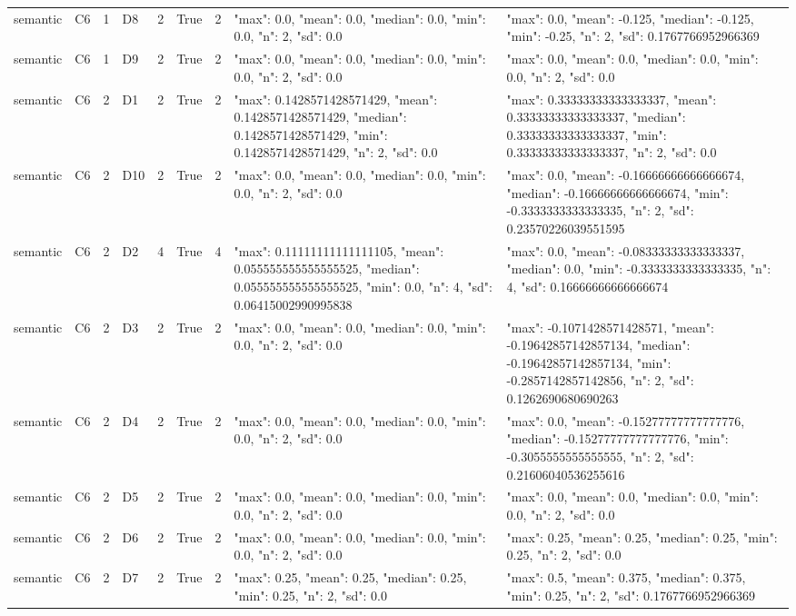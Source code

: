 \begin{tabular}{lllllllll}
semantic & C6 & 1 & D8 & 2 & True & 2 & {"max": 0.0, "mean": 0.0, "median": 0.0, "min": 0.0, "n": 2, "sd": 0.0} & {"max": 0.0, "mean": -0.125, "median": -0.125, "min": -0.25, "n": 2, "sd": 0.1767766952966369} \\
semantic & C6 & 1 & D9 & 2 & True & 2 & {"max": 0.0, "mean": 0.0, "median": 0.0, "min": 0.0, "n": 2, "sd": 0.0} & {"max": 0.0, "mean": 0.0, "median": 0.0, "min": 0.0, "n": 2, "sd": 0.0} \\
semantic & C6 & 2 & D1 & 2 & True & 2 & {"max": 0.1428571428571429, "mean": 0.1428571428571429, "median": 0.1428571428571429, "min": 0.1428571428571429, "n": 2, "sd": 0.0} & {"max": 0.33333333333333337, "mean": 0.33333333333333337, "median": 0.33333333333333337, "min": 0.33333333333333337, "n": 2, "sd": 0.0} \\
semantic & C6 & 2 & D10 & 2 & True & 2 & {"max": 0.0, "mean": 0.0, "median": 0.0, "min": 0.0, "n": 2, "sd": 0.0} & {"max": 0.0, "mean": -0.16666666666666674, "median": -0.16666666666666674, "min": -0.3333333333333335, "n": 2, "sd": 0.23570226039551595} \\
semantic & C6 & 2 & D2 & 4 & True & 4 & {"max": 0.11111111111111105, "mean": 0.055555555555555525, "median": 0.055555555555555525, "min": 0.0, "n": 4, "sd": 0.06415002990995838} & {"max": 0.0, "mean": -0.08333333333333337, "median": 0.0, "min": -0.3333333333333335, "n": 4, "sd": 0.16666666666666674} \\
semantic & C6 & 2 & D3 & 2 & True & 2 & {"max": 0.0, "mean": 0.0, "median": 0.0, "min": 0.0, "n": 2, "sd": 0.0} & {"max": -0.1071428571428571, "mean": -0.19642857142857134, "median": -0.19642857142857134, "min": -0.2857142857142856, "n": 2, "sd": 0.1262690680690263} \\
semantic & C6 & 2 & D4 & 2 & True & 2 & {"max": 0.0, "mean": 0.0, "median": 0.0, "min": 0.0, "n": 2, "sd": 0.0} & {"max": 0.0, "mean": -0.15277777777777776, "median": -0.15277777777777776, "min": -0.3055555555555555, "n": 2, "sd": 0.21606040536255616} \\
semantic & C6 & 2 & D5 & 2 & True & 2 & {"max": 0.0, "mean": 0.0, "median": 0.0, "min": 0.0, "n": 2, "sd": 0.0} & {"max": 0.0, "mean": 0.0, "median": 0.0, "min": 0.0, "n": 2, "sd": 0.0} \\
semantic & C6 & 2 & D6 & 2 & True & 2 & {"max": 0.0, "mean": 0.0, "median": 0.0, "min": 0.0, "n": 2, "sd": 0.0} & {"max": 0.25, "mean": 0.25, "median": 0.25, "min": 0.25, "n": 2, "sd": 0.0} \\
semantic & C6 & 2 & D7 & 2 & True & 2 & {"max": 0.25, "mean": 0.25, "median": 0.25, "min": 0.25, "n": 2, "sd": 0.0} & {"max": 0.5, "mean": 0.375, "median": 0.375, "min": 0.25, "n": 2, "sd": 0.1767766952966369} \\

\end{tabular}
